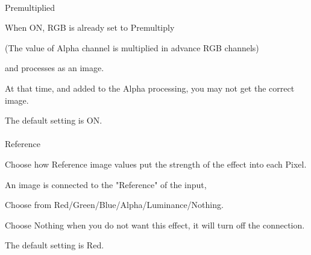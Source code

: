\documentclass[a4paper,12pt]{article}
\begin{document}
\newpage

\thispagestyle{empty}

\ \vspace{-0.2em}
\par
\noindent Premultiplied\par
When ON, RGB is already set to Premultiply\par
(The value of Alpha channel is multiplied in advance RGB channels)\par
and processes as an image.\par
At that time, and added to the Alpha processing, you may not get the correct image.\par
The default setting is ON.\\
\\
Reference\par
Choose how Reference image values put the strength of the effect into each Pixel.\par
An image is connected to the "Reference" of the input,\par
Choose from Red/Green/Blue/Alpha/Luminance/Nothing.\par
Choose Nothing when you do not want this effect, it will turn off the connection.\par
The default setting is Red.
\end{document}
